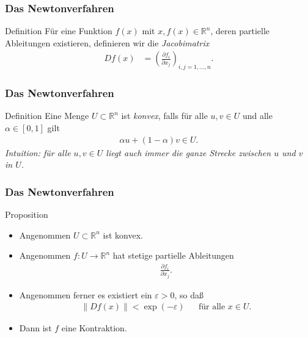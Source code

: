 \documentclass{beamer}
\renewcommand{\emph}[1]{{\textcolor{solarizedRed}{\itshape #1}}}
\newcommand\RR{\mathbb R}
\newcommand{\eps}{\varepsilon}
\newcommand\bc[1]{\left({#1}\right)}
\newcommand{\ue}{\"u}
\newcommand{\mytitle}{Das Newtonverfahren}
\begin{document}
\begin{frame}\frametitle{\mytitle}
	\begin{block}{Definition}
			F\ue r eine Funktion $f(x)$ mit $x,f(x)\in\RR^n$, deren partielle Ableitungen existieren, definieren wir die \emph{Jacobimatrix}
				\begin{align*}
					Df(x)&=\bc{\frac{\partial f_i}{\partial x_j}}_{i,j=1,\ldots,n}.
				\end{align*}
	\end{block}
\end{frame}

\begin{frame}\frametitle{\mytitle}
	\begin{block}{Definition}
		Eine Menge $U\subset\RR^n$ ist \emph{konvex}, falls f\ue r alle $u,v\in U$ und alle $\alpha\in[0,1]$ gilt
		\begin{align*}
			\alpha u+(1-\alpha)v\in U.
		\end{align*}
		{\itshape Intuition: f\ue r alle $u,v\in U$ liegt auch immer die ganze Strecke zwischen $u$ und $v$ in $U$.}
	\end{block}
\end{frame}

\begin{frame}\frametitle{\mytitle}
	\begin{block}{Proposition}
		\begin{itemize}
		\item Angenommen $U\subset\RR^n$ ist konvex.
		\item Angenommen $f:U\to\RR^n$ hat stetige partielle Ableitungen
			\begin{align*}
			\frac{\partial f_i}{\partial x_j}.
			\end{align*}
		\item Angenommen ferner es existiert ein $\eps>0$, so da\ss
			\begin{align*}
				\|Df(x)\|<\exp(-\eps)&&\mbox{f\ue r alle }x\in U.
			\end{align*}
		\item Dann ist $f$ eine Kontraktion.
		\end{itemize}
	\end{block}
\end{frame}
\end{document}
